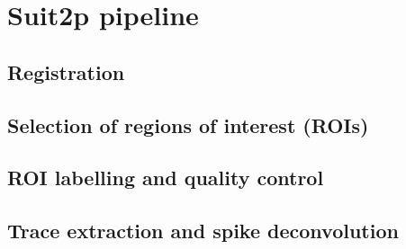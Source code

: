 \section{Suit2p pipeline}
\label{sec:sectionc}

\subsection{Registration}
\label{subsec:subasectionA}

\subsection{Selection of regions of interest (ROIs)}

\subsection{ROI labelling and quality control}

\subsection{Trace extraction and spike deconvolution}